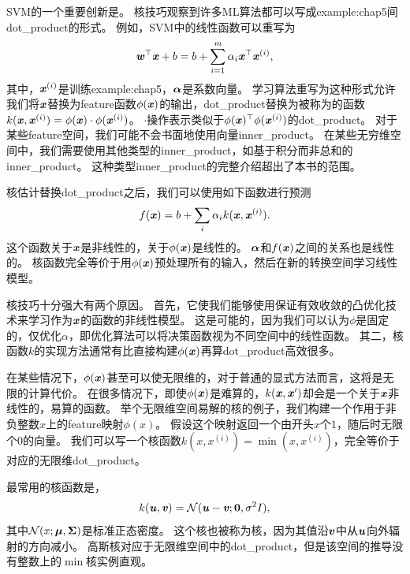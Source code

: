 \gls{SVM}的一个重要创新是。
核技巧观察到许多\gls{ML}算法都可以写成\gls{example:chap5}间\gls{dot_product}的形式。
例如，\gls{SVM}中的线性函数可以重写为
\begin{equation}
    \boldsymbol{\mathit{w}}^\top \boldsymbol{\mathit{x}} + b = b + \sum_{i=1}^m \alpha_i \boldsymbol{\mathit{x}}^\top \boldsymbol{\mathit{x}}^{(i)} ,
\end{equation}
其中，$\boldsymbol{\mathit{x}}^{(i)}$是训练\gls{example:chap5}，$\boldsymbol{\alpha}$是系数向量。
学习算法重写为这种形式允许我们将$\boldsymbol{\mathit{x}}$替换为\gls{feature}函数$\phi(\boldsymbol{\mathit{x}})$的输出，\gls{dot_product}替换为被称为的函数$k(\boldsymbol{\mathit{x}}, \boldsymbol{\mathit{x}}^{(i)}) = \phi(\boldsymbol{\mathit{x}})\cdot \phi(\boldsymbol{\mathit{x}}^{(i)})$。
$\cdot$操作表示类似于$\phi(\boldsymbol{\mathit{x}})^\top \phi(\boldsymbol{\mathit{x}}^{(i)})$的\gls{dot_product}。
对于某些\gls{feature}空间，我们可能不会书面地使用向量\gls{inner_product}。
在某些无穷维空间中，我们需要使用其他类型的\gls{inner_product}，如基于积分而非总和的\gls{inner_product}。
这种类型\gls{inner_product}的完整介绍超出了本书的范围。

核估计替换\gls{dot_product}之后，我们可以使用如下函数进行预测
\begin{equation}
    f(\boldsymbol{\mathit{x}}) = b + \sum_i \alpha_i k(\boldsymbol{\mathit{x}}, \boldsymbol{\mathit{x}}^{(i)}) .
\end{equation}
这个函数关于$\boldsymbol{\mathit{x}}$是非线性的，关于$\phi(\boldsymbol{\mathit{x}})$是线性的。
$\boldsymbol{\alpha}$和$f(\boldsymbol{\mathit{x}})$之间的关系也是线性的。
核函数完全等价于用$\phi(\boldsymbol{\mathit{x}})$预处理所有的输入，然后在新的转换空间学习线性模型。

核技巧十分强大有两个原因。
首先，它使我们能够使用保证有效收敛的凸优化技术来学习作为$\boldsymbol{\mathit{x}}$的函数的非线性模型。
这是可能的，因为我们可以认为$\phi$是固定的，仅优化$\alpha$，即优化算法可以将决策函数视为不同空间中的线性函数。
其二，核函数$k$的实现方法通常有比直接构建$\phi(\boldsymbol{\mathit{x}})$再算\gls{dot_product}高效很多。

在某些情况下，$\phi(\boldsymbol{\mathit{x}})$甚至可以使无限维的，对于普通的显式方法而言，这将是无限的计算代价。
在很多情况下，即使$\phi(\boldsymbol{\mathit{x}})$是难算的，$k(\boldsymbol{\mathit{x}},\boldsymbol{\mathit{x}}')$却会是一个关于$\boldsymbol{\mathit{x}}$非线性的，易算的函数。
举个无限维空间易解的核的例子，我们构建一个作用于非负整数$x$上的\gls{feature}映射$\phi(x)$。
假设这个映射返回一个由开头$x$个$1$，随后时无限个$0$的向量。
我们可以写一个核函数$k(x,x^{(i)}) = \min(x, x^{(i)})$，完全等价于对应的无限维\gls{dot_product}。


最常用的核函数是，
\begin{equation}
    k(\boldsymbol{\mathit{u}}, \boldsymbol{\mathit{v}}) = \mathcal{N} (\boldsymbol{\mathit{u}} - \boldsymbol{\mathit{v}}; \mathbf{0}, \sigma^2 I) ,
\end{equation}
其中$\mathcal{N}(x; \boldsymbol{\mu}, \boldsymbol{\Sigma})$是标准正态密度。
这个核也被称为核，因为其值沿$\boldsymbol{\mathit{v}}$中从$\boldsymbol{\mathit{u}}$向外辐射的方向减小。
高斯核对应于无限维空间中的\gls{dot_product}，但是该空间的推导没有整数上的$\min$核实例直观。

